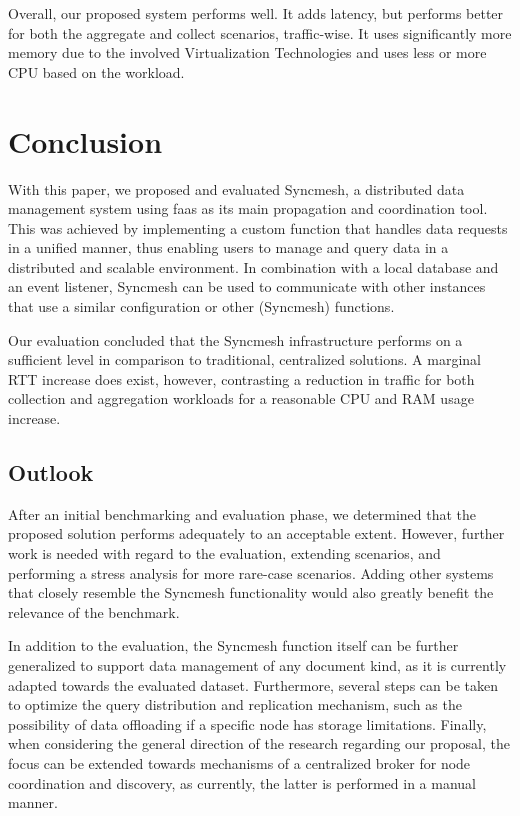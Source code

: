 \documentclass[conference]{IEEEtran}
\begin{document}
Overall, our proposed system performs well. It adds latency, but performs better for both the aggregate and collect scenarios, traffic-wise. It uses significantly more memory due to the involved Virtualization Technologies and uses less or more CPU based on the workload. 

\newpage
\section{Conclusion}\label{Chap:Conclusion}

With this paper, we proposed and evaluated Syncmesh, a distributed data management system using \ac{faas} as its main propagation and coordination tool. This was achieved by implementing a custom function that handles data requests in a unified manner, thus enabling users to manage and query data in a distributed and scalable environment. In combination with a local database and an event listener, Syncmesh can be used to communicate with other instances that use a similar configuration or other (Syncmesh) functions. 

Our evaluation concluded that the Syncmesh infrastructure performs on a sufficient level in comparison to traditional, centralized solutions. A marginal RTT increase does exist, however, contrasting a reduction in traffic for both collection and aggregation workloads for a reasonable CPU and RAM usage increase.


\subsection{Outlook}\label{Sec:Outlook}
After an initial benchmarking and evaluation phase, we determined that the proposed solution performs adequately to an acceptable extent. However, further work is needed with regard to the evaluation, extending scenarios, and performing a stress analysis for more rare-case scenarios. Adding other systems that closely resemble the Syncmesh functionality would also greatly benefit the relevance of the benchmark.

In addition to the evaluation, the Syncmesh function itself can be further generalized to support data management of any document kind, as it is currently adapted towards the evaluated dataset. Furthermore, several steps can be taken to optimize the query distribution and replication mechanism, such as the possibility of data offloading if a specific node has storage limitations. Finally, when considering the general direction of the research regarding our proposal, the focus can be extended towards mechanisms of a centralized broker for node coordination and discovery, as currently, the latter is performed in a manual manner.

\printbibliography








\end{document}
